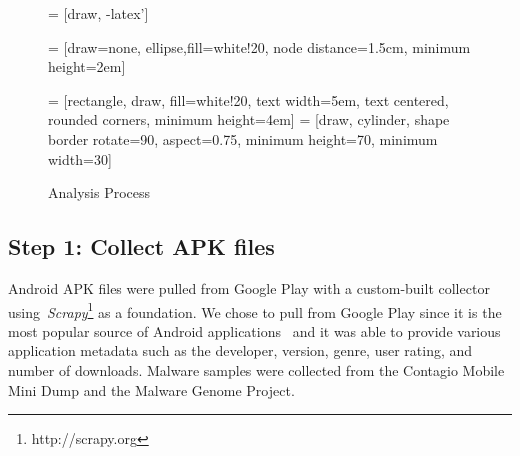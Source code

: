 \documentclass{sig-alternate-05-2015}
\begin{document}
\begin{figure}[]
\begin{center}

 = [draw, -latex']

 = [draw=none, ellipse,fill=white!20, node distance=1.5cm, minimum height=2em]

 = [rectangle, draw, fill=white!20, text width=5em, text centered, rounded corners, minimum height=4em]
 = [draw, cylinder, shape border rotate=90, aspect=0.75, minimum height=70, minimum width=30]

\caption{Analysis Process}
\label{fig:analysisprocess}
\end{center}
\end{figure}


\label{sec: collection}
\subsection{Step 1: Collect APK files}

Android APK files were pulled from Google Play with a custom-built collector using~\emph{Scrapy}\footnote{http://scrapy.org} as a foundation. We chose to pull from Google Play since it is the most popular source of Android applications~\cite{listofstores_URL} and it was able to provide various application metadata such as the developer, version, genre, user rating, and number of downloads. Malware samples were collected from the Contagio Mobile Mini Dump and the Malware Genome Project.
\end{document}
